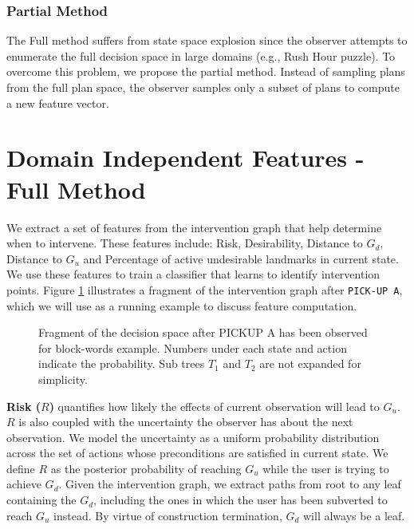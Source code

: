 \subsubsection{Partial Method}
The Full method suffers from state space explosion since the observer attempts to enumerate the full decision space in large domains (e.g., Rush Hour puzzle). To overcome this problem, we propose the partial method. Instead of sampling plans from the full plan space, the observer samples only a subset of plans to compute a new feature vector.

\section{Domain Independent Features - Full Method}
We extract a set of features from the intervention graph that help determine when to intervene. These features include: Risk, Desirability, Distance to $G_d$, Distance to $G_u$ and Percentage of active undesirable landmarks in current state. We use these features to train a classifier that learns to identify intervention points. Figure \ref{fig:feature} illustrates a fragment of the intervention graph after \texttt{PICK-UP A}, which we will use as a running example to discuss feature computation.

\begin{figure}[tb]
	\caption{Fragment of the decision space after PICKUP A has been observed for block-words example. Numbers under each state and action indicate the probability. Sub trees $T_1$ and $T_2$ are not expanded for simplicity.}
	\label{fig:feature}
\end{figure} 

\textbf{Risk ($R$)} quantifies how likely the effects of current observation will lead to $G_u$. $R$ is also coupled with the uncertainty the observer has about the next observation. We model the uncertainty as a uniform probability distribution across the set of actions whose preconditions are satisfied in current state. We define $R$ as the posterior probability of reaching $G_u$ while the user is trying to achieve $G_d$. Given the intervention graph, we extract paths from root to any leaf containing the $G_d$, including the ones in which the user has been subverted to reach $G_u$ instead. By virtue of construction termination, $G_d$ will always be a leaf.

